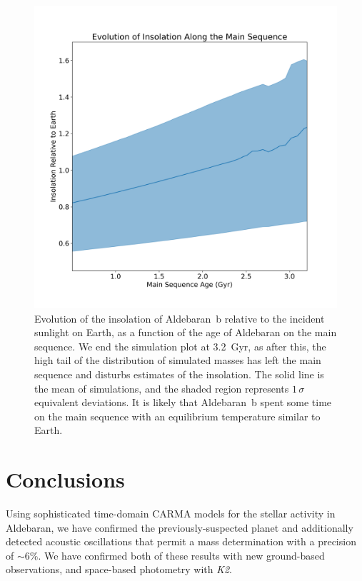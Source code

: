 \documentclass[modern]{aastex61}
\newcommand{\ktwo}{\emph{K2}\xspace}
\begin{document}
\begin{figure}
\centering
\includegraphics[width=\textwidth]{insolation}
\caption{Evolution of the insolation of Aldebaran~b relative to the incident sunlight on Earth, as a function of the age of Aldebaran on the main sequence. We end the simulation plot at 3.2~Gyr, as after this, the high tail of the distribution of simulated masses has left the main sequence and disturbs estimates of the insolation. The solid line is the mean of simulations, and the shaded region represents $1\,\sigma$ equivalent deviations. It is likely that Aldebaran~b spent some time on the main sequence with an equilibrium temperature similar to Earth.}
\label{insolation}
\end{figure}

\section{Conclusions}

Using sophisticated time-domain CARMA models for the stellar activity in
Aldebaran, we have confirmed the previously-suspected planet and additionally
detected acoustic oscillations that permit a mass determination with a precision
of $\sim 6\%$. We have confirmed both of these results with new ground-based
observations, and space-based photometry with \ktwo.
\end{document}
